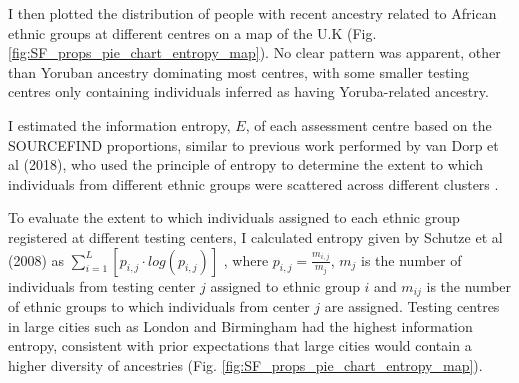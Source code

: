 I then plotted the distribution of people with recent ancestry related to African ethnic groups at different centres on a map of the U.K (Fig. \ref{fig:SF_props_pie_chart_entropy_map}). No clear pattern was apparent, other than Yoruban ancestry dominating most centres, with some smaller testing centres only containing individuals inferred as having Yoruba-related ancestry.  
 
I estimated the information entropy, $E$, of each assessment centre based on the SOURCEFIND proportions, similar to previous work performed by van Dorp et al (2018), who used the principle of entropy to determine the extent to which individuals from different ethnic groups were scattered across different clusters \cite{van2019genetic}.

To evaluate the extent to which individuals assigned to each ethnic group registered at different testing centers, I calculated entropy given by Schutze et al (2008) as $\sum_{i=1}^{L} [p_{i,j} \cdot log(p_{i,j})]$ \cite{schutze2008introduction}, where $p_{i,j} = \frac{m_{i,j}}{m_{j}}$, $m_{j}$ is the number of individuals from testing center $j$ assigned to ethnic group $i$ and $m_{ij}$ is the number of ethnic groups to which individuals from center $j$ are assigned. Testing centres in large cities such as London and Birmingham had the highest information entropy, consistent with prior expectations that large cities would contain a higher diversity of ancestries (Fig. \ref{fig:SF_props_pie_chart_entropy_map}). 


